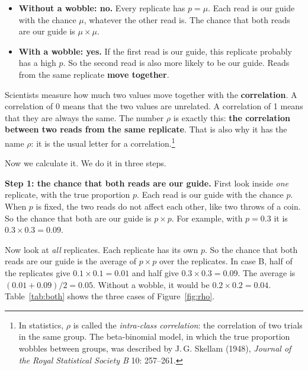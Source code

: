 \begin{itemize}
\item \textbf{Without a wobble: no.} Every replicate has $p = \mu$. Each read
  is our guide with the chance $\mu$, whatever the other read is. The chance
  that both reads are our guide is $\mu \times \mu$.
\item \textbf{With a wobble: yes.} If the first read is our guide, this
  replicate probably has a high $p$. So the second read is also more likely
  to be our guide. Reads from the same replicate \textbf{move together}.
\end{itemize}

Scientists measure how much two values move together with the
\textbf{correlation}. A correlation of 0 means that the two values are
unrelated. A correlation of 1 means that they are always the same. The
number $\rho$ is exactly this: \textbf{the correlation between two reads
from the same replicate}. That is also why it has the name $\rho$: it is
the usual letter for a correlation.\footnote{In statistics, $\rho$ is
called the \emph{intra-class correlation}: the correlation of two trials in
the same group. The beta-binomial model, in which the true proportion
wobbles between groups, was described by J.\,G. Skellam (1948), \emph{Journal
of the Royal Statistical Society B} 10: 257--261.}

Now we calculate it. We do it in three steps.

\textbf{Step 1: the chance that both reads are our guide.} First look
inside \emph{one} replicate, with the true proportion $p$. Each read is our
guide with the chance $p$. When $p$ is fixed, the two reads do not affect
each other, like two throws of a coin. So the chance that both are our
guide is $p \times p$. For example, with $p = 0.3$ it is
$0.3 \times 0.3 = 0.09$.

Now look at \emph{all} replicates. Each replicate has its own $p$. So the
chance that both reads are our guide is the average of $p \times p$ over the
replicates. In case B, half of the replicates give $0.1 \times 0.1 = 0.01$
and half give $0.3 \times 0.3 = 0.09$. The average is
$(0.01 + 0.09)/2 = 0.05$. Without a wobble, it would be
$0.2 \times 0.2 = 0.04$. Table~\ref{tab:both} shows the three cases of
Figure~\ref{fig:rho}.


